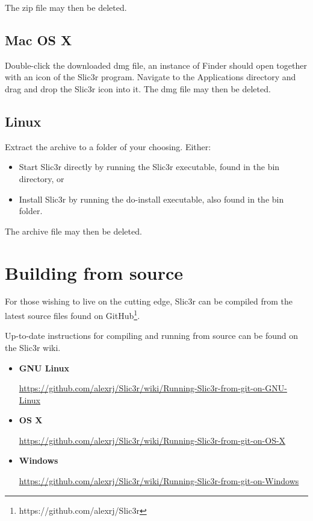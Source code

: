 The zip file may then be deleted.

\subsection{Mac OS X}

Double-click the downloaded dmg file, an instance of Finder should open together with an icon of the Slic3r program.  Navigate to the Applications directory and drag and drop the Slic3r icon into it.
The dmg file may then be deleted.

\subsection{Linux}

Extract the archive to a folder of your choosing.
Either:
\begin{itemize}
\item Start Slic3r directly by running the Slic3r executable, found in the bin directory, or
\item Install Slic3r by running the do-install executable, also found in the bin folder.
\end{itemize}
The archive file may then be deleted.



\section{Building from source} %
\label{sec:building_from_source}

For those wishing to live on the cutting edge, Slic3r can be compiled from the latest source files found on GitHub\footnote{https://github.com/alexrj/Slic3r}.

Up-to-date instructions for compiling and running from source can be found on the Slic3r wiki.

\begin{itemize}
    \item \textbf{GNU Linux} \par\url{https://github.com/alexrj/Slic3r/wiki/Running-Slic3r-from-git-on-GNU-Linux}
    \item \textbf{OS X} \par\url{https://github.com/alexrj/Slic3r/wiki/Running-Slic3r-from-git-on-OS-X}
    \item \textbf{Windows} \par\url{https://github.com/alexrj/Slic3r/wiki/Running-Slic3r-from-git-on-Windows}

\end{itemize}
